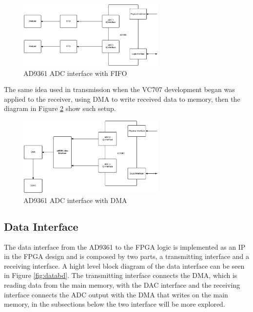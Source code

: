 \begin{figure}[htbp]
    \centering
    \includegraphics[width=0.65\textwidth]{./figures/adc_fifo}
    \caption{ AD9361 ADC interface with FIFO
    \label{fig:ad9361rxfifo}}
\end{figure}

The same idea used in transmission when the VC707 development began was applied
to the receiver, using DMA to write received data to memory, then the diagram in
Figure \ref{fig:ad9361rxdma} show such setup.

\begin{figure}[htbp]
    \centering
    \includegraphics[width=0.65\textwidth]{./figures/adc_dma}
    \caption{ AD9361 ADC interface with DMA
    \label{fig:ad9361rxdma}}
\end{figure}


\subsection{Data Interface}

The data interface from the AD9361 to the FPGA logic is implemented as an IP in
the FPGA design and is composed by two parts, a transmitting interface and a
receiving interface. A hight level block diagram of the data interface can be
seen in Figure \ref{fig:databd}. The transmitting interface connects the DMA,
which is reading data from the main memory, with the DAC interface and the
receiving interface connects the ADC output with the DMA that writes on the main
memory, in the subsections below the two interface will be more explored.

